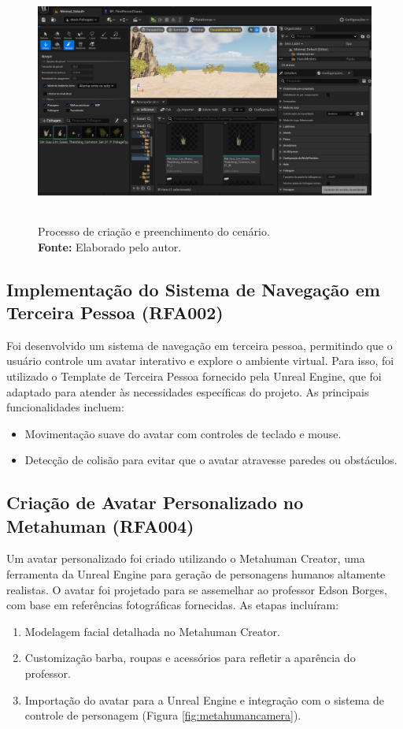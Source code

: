 \begin{figure}[H]
        \centering
        \includegraphics[height=8cm, keepaspectratio]{img/unreal/paisagem grass.png}
        \caption{Processo de criação e preenchimento do cenário. \\
            \textbf{Fonte:} Elaborado pelo autor.}
        \label{fig:grama}
\end{figure}


\subsection{Implementação do Sistema de Navegação em Terceira Pessoa (RFA002)}
Foi desenvolvido um sistema de navegação em terceira pessoa, permitindo que o usuário controle um avatar interativo e explore o ambiente virtual. Para isso, foi utilizado o Template de Terceira Pessoa fornecido pela Unreal Engine, que foi adaptado para atender às necessidades específicas do projeto. As principais funcionalidades incluem:
\begin{itemize}
    \item Movimentação suave do avatar com controles de teclado e mouse.
    \item Detecção de colisão para evitar que o avatar atravesse paredes ou obstáculos.
\end{itemize}

\subsection{Criação de Avatar Personalizado no Metahuman (RFA004)}
Um avatar personalizado foi criado utilizando o Metahuman Creator, uma ferramenta da Unreal Engine para geração de personagens humanos altamente realistas. O avatar foi projetado para se assemelhar ao professor Edson Borges, com base em referências fotográficas fornecidas. As etapas incluíram:
\begin{enumerate}
    \item Modelagem facial detalhada no Metahuman Creator.
    \item Customização barba, roupas e acessórios para refletir a aparência do professor.
    \item Importação do avatar para a Unreal Engine e integração com o sistema de controle de personagem (Figura \ref{fig:metahumancamera}).
\end{enumerate}

